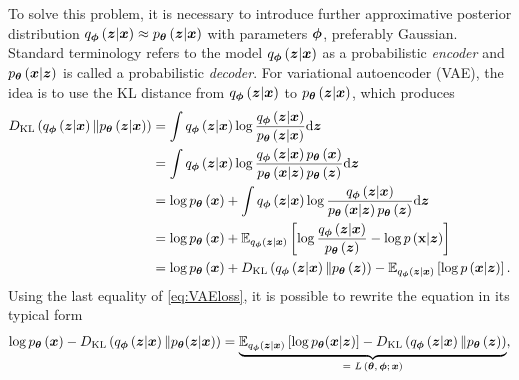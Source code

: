 To solve this problem, it is necessary to introduce further approximative posterior distribution $q_{\boldsymbol{\phi}}\left(\boldsymbol{z}\vert\boldsymbol{x}\right) \approx p_{\boldsymbol{\theta}}\left(\boldsymbol{z}\vert\boldsymbol{x}\right)$ with parameters $\boldsymbol{\phi}$, preferably Gaussian. Standard terminology refers to the model $q_{\boldsymbol{\phi}}\left(\boldsymbol{z}\vert\boldsymbol{x}\right)$ as a probabilistic \emph{encoder} and  $p_{\boldsymbol{\theta}}\left(\boldsymbol{x}\vert \boldsymbol{z}\right)$ is called a probabilistic \emph{decoder}. For variational autoencoder (VAE), the idea is to use the KL distance from $q_{\boldsymbol{\phi}}\left(\boldsymbol{z}\vert\boldsymbol{x}\right)$ to $p_{\boldsymbol{\theta}}\left(\boldsymbol{z}\vert \boldsymbol{x}\right)$, which produces
\begin{equation}\label{eq:VAEloss}
\begin{split}
D_{\mathrm{KL}}\left(q_{\boldsymbol{\phi}}\left(\boldsymbol{z}\vert \boldsymbol{x} \right) \Vert p_{\boldsymbol{\theta}}\left(\boldsymbol{z}\vert \boldsymbol{x}\right)\right) & = 
\int q_{\boldsymbol{\phi}}\left(\boldsymbol{z}\vert \boldsymbol{x} \right) \log \frac{q_{\boldsymbol{\phi}}\left(\boldsymbol{z}\vert \boldsymbol{x} \right)}{p_{\boldsymbol{\theta}}\left(\boldsymbol{z}\vert \boldsymbol{x}\right)} \mathrm{d}{\boldsymbol{z}} \\
& =  \int q_{\boldsymbol{\phi}}\left(\boldsymbol{z}\vert \boldsymbol{x} \right) \log \frac{q_{\boldsymbol{\phi}}\left(\boldsymbol{z}\vert \boldsymbol{x} \right)p_{\boldsymbol{\theta}}\left(\boldsymbol{x}\right)}{p_{\boldsymbol{\theta}}\left(\boldsymbol{x} \vert \boldsymbol{z}\right) p_{\boldsymbol{\theta}}\left(\boldsymbol{z}\right)} \mathrm{d}{\boldsymbol{z}} \\
& = \log p_{\boldsymbol{\theta}}\left(\boldsymbol{x}\right) +  \int q_{\boldsymbol{\phi}}\left(\boldsymbol{z}\vert \boldsymbol{x} \right) \log \frac{q_{\boldsymbol{\phi}}\left(\boldsymbol{z}\vert \boldsymbol{x} \right)}{p_{\boldsymbol{\theta}}\left(\boldsymbol{x} \vert \boldsymbol{z}\right)p_{\boldsymbol{\theta}}\left(\boldsymbol{z}\right) } \mathrm{d}{\boldsymbol{z}} \\
& = \log p_{\boldsymbol{\theta}}\left(\boldsymbol{x}\right) +  \mathbb{E}_{q_{\boldsymbol{\phi}}\left(\boldsymbol{z}\vert \boldsymbol{x} \right)}\left[\log\frac{q_{\boldsymbol{\phi}}\left(\boldsymbol{z}\vert \boldsymbol{x} \right)}{p_{\boldsymbol{\theta}}\left(\boldsymbol{z}\right)} - \log p\left(\textbf{x}\vert \boldsymbol{z}\right)\right]\\
    & = \log p_{\boldsymbol{\theta}}\left(\boldsymbol{x}\right) +D_{\mathrm{KL}} \left(q_{\boldsymbol{\phi}}\left(\boldsymbol{z}\vert \boldsymbol{x} \right) \Vert p_{\boldsymbol{\theta}}\left(\boldsymbol{z}\right) \right) -  \mathbb{E}_{q_{\boldsymbol{\phi}}\left(\boldsymbol{z}\vert \boldsymbol{x} \right)}\left[\log p\left(\boldsymbol{x}\vert \boldsymbol{z}\right)\right].
 \end{split}
\end{equation}
Using the last equality of \eqref{eq:VAEloss}, it is possible to rewrite the equation in its typical form
\begin{equation}
\log p_{\boldsymbol{\theta}}\left(\boldsymbol{x}\right) - D_{\mathrm{KL}}\left(q_{\boldsymbol{\phi}}\left(\boldsymbol{z}\vert \boldsymbol{x} \right) \Vert p_{\boldsymbol{\theta}}(\boldsymbol{z}\vert \boldsymbol{x})\right) = \underbrace{\mathbb{E}_{q_{\boldsymbol{\phi}}\left(\boldsymbol{z}\vert \boldsymbol{x} \right)}\left[\log p_{\boldsymbol{\theta}}(\boldsymbol{x}\vert \boldsymbol{z}) \right] - D_{\mathrm{KL}}\left(q_{\boldsymbol{\phi}}\left(\boldsymbol{z}\vert\boldsymbol{x} \right) \Vert p_{\boldsymbol{\theta}}\left(\boldsymbol{z}\right)\right)}_{\text{= $L\left(\boldsymbol{\theta},\boldsymbol{\phi}; \boldsymbol{x}\right)$}},
\end{equation}
